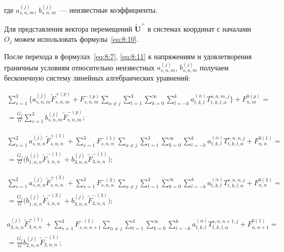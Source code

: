 \noindent где $a_{s,n,m}^{(j)}$, $b_{s,n,m}^{(j)}$~--- неизвестные коэффициенты.

Для представления вектора перемещений $\mathbf{\tilde U}^+$ в системах координат с началами $O_j$ можем использовать формулы~\eqref{eq:8:10}.

После перехода в формулах~\eqref{eq:8:7}, \eqref{eq:8:11} к напряжениям и удовлетворения граничным условиям относительно неизвестных $a_{s,n,m}^{(j)}$, $b_{s,n,m}^{(j)}$ получаем бесконечную систему линейных алгебраических уравнений:

\begin{multline}
\sum_{s=1}^3 \bigg\{a_{s,n,m}^{(j)}{\tilde F}_{s,n,m}^{+(p)}+F_{s,n,m}^{-(p)}\sum _{\alpha\neq j} \sum _{t=1}^3 \sum _{k=0}^{\infty}\sum_{l=-k}^k a_{t,k,l}^{(\alpha)} T_{t,k,l,\alpha}^{s,n,m,j}\bigg\}+F_{n,m}^{0(p)}= \\
=\frac{G_j}{G}\sum_{s=1}^3 b_{s,n,m}^{(j)}{\tilde F}_{s,n,m}^{-(p)};
\label{eq:13:1a}
\end{multline}

\begin{multline}
\sum_{s=1}^2 a_{s,n,n}^{(j)}{\tilde F}_{s,n,n}^{+(1)}+\sum_{s=1}^3 F_{s,n,n}^{-(1)}\sum _{\alpha\neq j} \sum _{t=1}^3 \sum _{k=0}^{\infty}\sum_{l=-k}^k a_{t,k,l}^{(\alpha)} T_{t,k,l,\alpha}^{s,n,n,j}+F_{n,n}^{0(1)}= \\
=\frac{G_j}{G}\bigg(b_{1,n,n}^{(j)}{\tilde F}_{1,n,n}^{-(1)}+b_{3,n,n}^{(j)}{\tilde F}_{3,n,n}^{-(1)}\bigg);
\label{eq:13:2a}
\end{multline}

\begin{multline}
\sum _{s=1}^2 a_{s,n,n}^{(j)}{\tilde F}_{s,n,n}^{+(3)}+\sum_{s=1}^3 F_{s,n,n}^{-(3)}\sum _{\alpha\neq j} \sum _{t=1}^3 \sum _{k=0}^{\infty}\sum_{l=-k}^k a_{t,k,l}^{(\alpha)} T_{t,k,l,\alpha}^{s,n,n,j}+F_{n,n}^{0(3)}= \\
=\frac{G_j}{G}\bigg(b_{1,n,n}^{(j)}{\tilde F}_{1,n,n}^{-(3)}+b_{3,n,n}^{(j)}{\tilde F}_{3,n,n}^{-(3)}\bigg);
\label{eq:13:3a}
\end{multline}

\begin{multline}
a_{3,n,n}^{(j)}{\tilde F}_{3,n,n}^{+(1)}+\sum_{s=1}^3 F_{s,n,n+1}^{-(1)}\sum _{\alpha\neq j} \sum _{t=1}^3 \sum _{k=0}^{\infty}\sum_{l=-k}^k a_{t,k,l}^{(\alpha)} T_{t,k,l,\alpha}^{s,n,n+1,j}+F_{n,n+1}^{0(1)}= \\
=\frac{G_j}{G}b_{2,n,n}^{(j)}{\tilde F}_{2,n,n}^{-(1)};
\label{eq:13:4a}
\end{multline}

